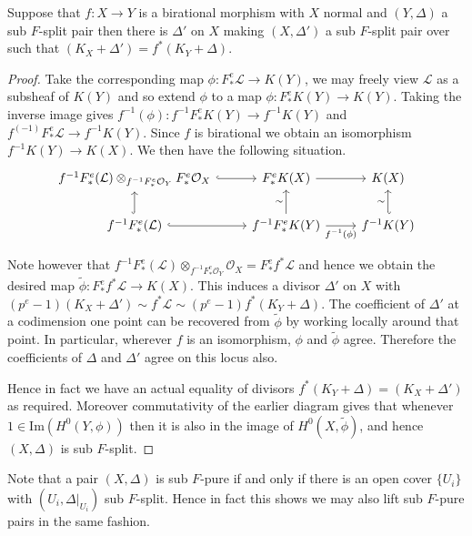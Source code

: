 \documentclass[a4paper,12pt]{book}
\newcommand{\Fe}{F^{e}_{*}}
\newcommand{\ox}[1][X]{\mathcal{O}_{#1}}
\begin{document}
\begin{lemma}\label{F-pullback}
	Suppose that $f:X \to Y$ is a birational morphism with $X$ normal and $(Y,\Delta)$ a sub $F$-split pair then there is $\Delta'$ on $X$ making $(X,\Delta')$ a sub $F$-split pair over such that $(K_{X}+\Delta')=f^{*}(K_{Y}+\Delta)$.  
\end{lemma}
\begin{proof}
	
	Take the corresponding map $\phi: \Fe\mathcal{L} \to K(Y)$, we may freely view $\mathcal{L}$ as a subsheaf of $K(Y)$ and so extend $\phi$ to a map $\phi: \Fe K(Y) \to K(Y)$. Taking the inverse image gives $f^{-1}(\phi): f^{-1}\Fe K(Y) \to f^{-1}K(Y)$ and $f^(-1)\Fe \mathcal{L} \to f^{-1}K(Y)$. Since $f$ is birational we obtain an isomorphism $f^{-1}K(Y) \to K(X)$. We then have the following situation.
	\[\begin{tikzcd}
	f^{-1}\Fe(\mathcal{L}) \otimes_{f^{-1}\Fe\mathcal{O}_{Y}}\Fe\ox \arrow[r, hook] & \Fe K(X) \arrow[r]                                          & K(X)                                \\
	f^{-1}\Fe(\mathcal{L}) \arrow[r, hook] \arrow[u, hook]                       & f^{-1}\Fe K(Y) \arrow[r, "f^{-1}(\phi)"'] \arrow[u, "\sim"] & f^{-1}K(Y) \arrow[u, "\sim", hook']
	\end{tikzcd}\]
	
	Note however that $f^{-1}\Fe(\mathcal{L}) \otimes_{f^{-1}\Fe\mathcal{O}_{Y}}\ox= \Fe f^{*}\mathcal{L}$ and hence we obtain the desired map $\tilde{\phi}: \Fe f^{*}\mathcal{L} \to K(X)$. This induces a divisor $\Delta'$ on $X$ with $(p^{e}-1)(K_{X}+\Delta') \sim f^{*}\mathcal{L} \sim (p^{e}-1)f^{*}(K_{Y}+\Delta)$. The coefficient of $\Delta'$ at a codimension one point can be recovered from $\tilde{\phi}$ by working locally around that point. In particular, wherever $f$ is an isomorphism, $\phi$ and $\tilde{\phi}$ agree. Therefore the coefficients of $\Delta$ and $\Delta'$ agree on this locus also.
	
	Hence in fact we have an actual equality of divisors $f^{*}(K_{Y}+\Delta)=(K_{X}+\Delta')$ as required. Moreover commutativity of the earlier diagram gives that whenever $1 \in \text{Im}(H^{0}(Y,\phi))$ then it is also in the image of $H^{0}(X,\tilde{\phi})$, and hence $(X,\Delta)$ is sub $F$-split.
\end{proof}

Note that a pair $(X,\Delta)$ is sub $F$-pure if and only if there is an open cover $\{U_{i}\}$ with $(U_{i},\Delta|_{U_{i}})$ sub $F$-split. Hence in fact this shows we may also lift sub $F$-pure pairs in the same fashion. 
\end{document}
